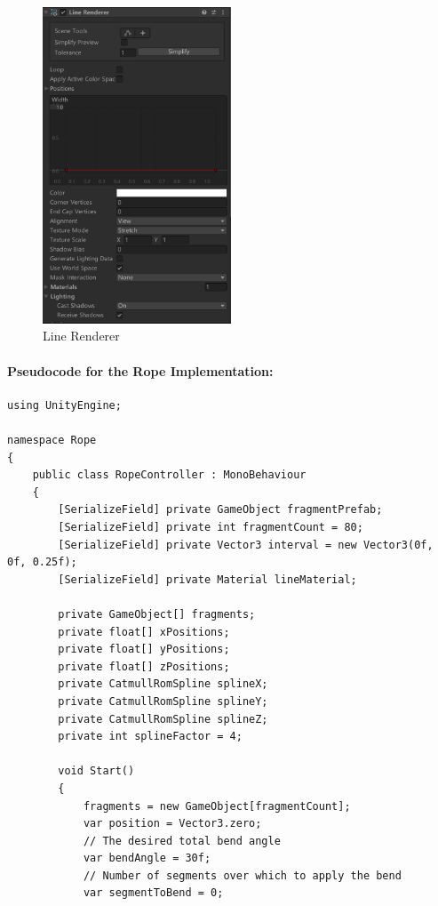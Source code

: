 \documentclass[12pt]{article}
\begin{document}
\begin{enumerate}
\begin{figure}[H]
            \includegraphics[width=0.5\textwidth]{render.png}
            \caption{Line Renderer}
      \end{figure}
      \paragraph{Pseudocode for the Rope Implementation:}
      \begin{verbatim}
using UnityEngine;

namespace Rope
{
    public class RopeController : MonoBehaviour
    {
        [SerializeField] private GameObject fragmentPrefab;
        [SerializeField] private int fragmentCount = 80;
        [SerializeField] private Vector3 interval = new Vector3(0f, 0f, 0.25f);
        [SerializeField] private Material lineMaterial; 

        private GameObject[] fragments;
        private float[] xPositions;
        private float[] yPositions;
        private float[] zPositions;
        private CatmullRomSpline splineX;
        private CatmullRomSpline splineY;
        private CatmullRomSpline splineZ;
        private int splineFactor = 4;

        void Start()
        {
            fragments = new GameObject[fragmentCount];
            var position = Vector3.zero;
            // The desired total bend angle
            var bendAngle = 30f; 
            // Number of segments over which to apply the bend
            var segmentToBend = 0; 


\end{verbatim}
\end{enumerate}
\end{document}
